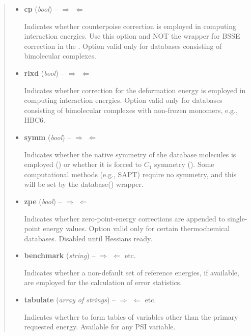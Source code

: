 \documentclass[letterpaper,10pt,english]{sphinxmanual}
\begin{document}
\begin{fulllineitems}
\begin{quote}
\begin{description}
\begin{itemize}
\item {} 
\textbf{cp} (\emph{bool}) -- 
 \textbar{}\textbar{} $\Rightarrow$  $\Leftarrow$

Indicates whether counterpoise correction is employed in computing
interaction energies. Use this option and NOT the {\hyperref[index:wrappers.cp]{}}
wrapper for BSSE correction in the .  Option
valid only for databases consisting of bimolecular complexes.


\item {} 
\textbf{rlxd} (\emph{bool}) -- 
 \textbar{}\textbar{} $\Rightarrow$  $\Leftarrow$

Indicates whether correction for the deformation energy is
employed in computing interaction energies.  Option valid only for
databases consisting of bimolecular complexes with non-frozen
monomers, e.g., HBC6.


\item {} 
\textbf{symm} (\emph{bool}) -- 
$\Rightarrow$  $\Leftarrow$ \textbar{}\textbar{} 

Indicates whether the native symmetry of the database molecules is
employed () or whether it is forced to $C_1$ symmetry
(). Some computational methods (e.g., SAPT) require no
symmetry, and this will be set by the database() wrapper.


\item {} 
\textbf{zpe} (\emph{bool}) -- 
 \textbar{}\textbar{} $\Rightarrow$  $\Leftarrow$

Indicates whether zero-point-energy corrections are appended to
single-point energy values. Option valid only for certain
thermochemical databases. Disabled until Hessians ready.


\item {} 
\textbf{benchmark} (\emph{string}) -- 
$\Rightarrow$  $\Leftarrow$ \textbar{}\textbar{}  \textbar{}\textbar{} etc.

Indicates whether a non-default set of reference energies, if
available, are employed for the calculation of error statistics.


\item {} 
\textbf{tabulate} (\emph{array of strings}) -- 
$\Rightarrow$ \code{{[}{]}} $\Leftarrow$ \textbar{}\textbar{}  \textbar{}\textbar{} etc.

Indicates whether to form tables of variables other than the
primary requested energy.  Available for any PSI variable.



\end{itemize}
\end{description}
\end{quote}
\end{fulllineitems}
\end{document}
